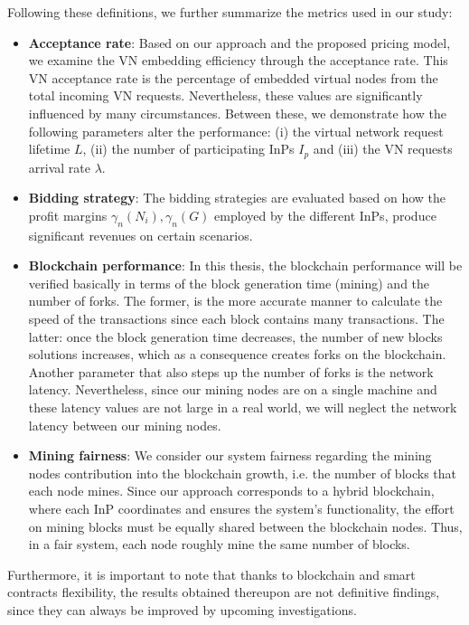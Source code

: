 Following these definitions, we further summarize the metrics used in our study:

 \begin{itemize}
\item \textbf{Acceptance rate}: Based on our approach and the proposed pricing model, we examine the VN embedding efficiency through the acceptance rate. This VN acceptance rate is the percentage of embedded virtual nodes from the total incoming VN requests. Nevertheless, these values are significantly influenced by many circumstances. Between these, we demonstrate how the following parameters alter the performance: (i) the virtual network request lifetime $L$, (ii) the number of participating InPs $I_p$ and (iii) the VN requests arrival rate $\lambda$.

\item \textbf{Bidding strategy}: The bidding strategies are evaluated based on how the profit margins $\gamma_n(N_i),\gamma_n(G)$ employed by the different InPs, produce significant revenues on certain scenarios. 

\item \textbf{Blockchain performance}: In this thesis, the blockchain performance will be verified basically in terms of the block generation time (mining) and the number of forks. The former, is the more accurate manner to calculate the speed of the transactions since each block contains many transactions. The latter: once the block generation time decreases, the number of new blocks solutions increases, which as a consequence creates forks on the blockchain. Another parameter that also steps up the number of forks is the network latency. Nevertheless, since our mining nodes are on a single machine and these latency values are not large in a real world, we will neglect the network latency between our mining nodes.
\item \textbf{Mining fairness}: We consider our system fairness regarding the mining nodes contribution into the blockchain growth, i.e. the number of blocks that each node mines. Since our approach corresponds to a hybrid blockchain, where each InP coordinates and ensures the system's functionality, the effort on mining blocks must be equally shared between the blockchain nodes. Thus, in a fair system, each node roughly mine the same number of blocks.
 \end{itemize}

Furthermore, it is important to note that thanks to blockchain and smart contracts flexibility, the results obtained thereupon are not definitive findings, since they can always be improved by upcoming investigations.

